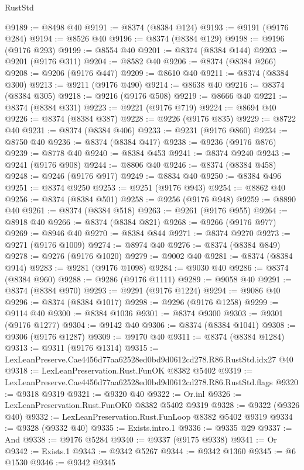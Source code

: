 \begin{lexlean}{RustStd}
\begin{coremodule}
@9189 := @8498 @40
@9191 := @8374 (@8384 @124)
@9193 := @9191 (@9176 @284)
@9194 := @8526 @40
@9196 := @8374 (@8384 @129)
@9198 := @9196 (@9176 @293)
@9199 := @8554 @40
@9201 := @8374 (@8384 @144)
@9203 := @9201 (@9176 @311)
@9204 := @8582 @40
@9206 := @8374 (@8384 @266)
@9208 := @9206 (@9176 @447)
@9209 := @8610 @40
@9211 := @8374 (@8384 @300)
@9213 := @9211 (@9176 @490)
@9214 := @8638 @40
@9216 := @8374 (@8384 @305)
@9218 := @9216 (@9176 @508)
@9219 := @8666 @40
@9221 := @8374 (@8384 @331)
@9223 := @9221 (@9176 @719)
@9224 := @8694 @40
@9226 := @8374 (@8384 @387)
@9228 := @9226 (@9176 @835)
@9229 := @8722 @40
@9231 := @8374 (@8384 @406)
@9233 := @9231 (@9176 @860)
@9234 := @8750 @40
@9236 := @8374 (@8384 @417)
@9238 := @9236 (@9176 @876)
@9239 := @8778 @40
@9240 := @8384 @453
@9241 := @8374 @9240
@9243 := @9241 (@9176 @908)
@9244 := @8806 @40
@9246 := @8374 (@8384 @458)
@9248 := @9246 (@9176 @917)
@9249 := @8834 @40
@9250 := @8384 @496
@9251 := @8374 @9250
@9253 := @9251 (@9176 @943)
@9254 := @8862 @40
@9256 := @8374 (@8384 @501)
@9258 := @9256 (@9176 @948)
@9259 := @8890 @40
@9261 := @8374 (@8384 @518)
@9263 := @9261 (@9176 @955)
@9264 := @8918 @40
@9266 := @8374 (@8384 @821)
@9268 := @9266 (@9176 @977)
@9269 := @8946 @40
@9270 := @8384 @844
@9271 := @8374 @9270
@9273 := @9271 (@9176 @1009)
@9274 := @8974 @40
@9276 := @8374 (@8384 @849)
@9278 := @9276 (@9176 @1020)
@9279 := @9002 @40
@9281 := @8374 (@8384 @914)
@9283 := @9281 (@9176 @1098)
@9284 := @9030 @40
@9286 := @8374 (@8384 @960)
@9288 := @9286 (@9176 @1111)
@9289 := @9058 @40
@9291 := @8374 (@8384 @970)
@9293 := @9291 (@9176 @1224)
@9294 := @9086 @40
@9296 := @8374 (@8384 @1017)
@9298 := @9296 (@9176 @1258)
@9299 := @9114 @40
@9300 := @8384 @1036
@9301 := @8374 @9300
@9303 := @9301 (@9176 @1277)
@9304 := @9142 @40
@9306 := @8374 (@8384 @1041)
@9308 := @9306 (@9176 @1287)
@9309 := @9170 @40
@9311 := @8374 (@8384 @1284)
@9313 := @9311 (@9176 @1314)
@9315 := LexLeanPreserve.Cae4456d77aa62528ed0bd9d0612cd278.R86.RustStd.idx27 @40
@9318 := LexLeanPreservation.Rust.FunOK @8382 @5402
@9319 := LexLeanPreserve.Cae4456d77aa62528ed0bd9d0612cd278.R86.RustStd.flags
@9320 := @9318 @9319
@9321 := @9320 @40
@9322 := Or.inl
@9326 := LexLeanPreservation.Rust.FunOK0 @8382 @5402 @9319
@9328 := @9322 (@9326 @40)
@9332 := LexLeanPreservation.Rust.FunLoop @8382 @5402 @9319
@9334 := @9328 (@9332 @40)
@9335 := Exists.intro.{1}
@9336 := @9335 @29
@9337 := And
@9338 := @9176 @5284
@9340 := @9337 (@9175 @9338)
@9341 := Or
@9342 := Exists.{1}
@9343 := @9342 @5267
@9344 := @9342 @1360
@9345 := @6 @1530
@9346 := @9342 @9345

\end{coremodule}
\end{lexlean}
